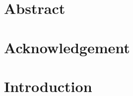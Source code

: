 \documentclass[a4paper,10pt,twoside]{report}
\author{\me}
\begin{document}

\normalsize

\clearpage


%

%

\chapter*{Abstract}\label{ch:abstract}


\clearpage 

%


\chapter*{Acknowledgement}\label{ch:acknowledgement}


\clearpage 

\tableofcontents
\clearpage 

\listoffigures
\clearpage 

\listoftables
\clearpage


\chapter{Introduction}\label{ch:introduction}
\setcounter{page}{0}

\end{document}
